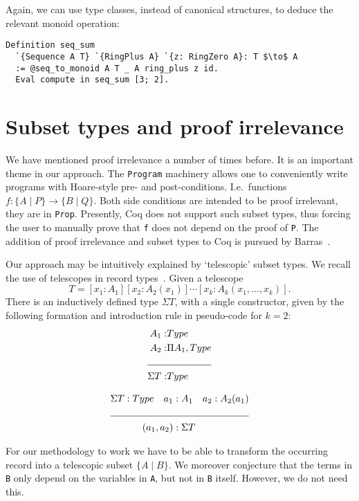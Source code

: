 \documentclass[a4paper,10pt,runningheads]{llncs}
\begin{document}
Again, we can use type classes, instead of canonical structures, to deduce the relevant monoid operation:
\begin{lstlisting}
Definition seq_sum
  `{Sequence A T} `{RingPlus A} `{z: RingZero A}: T $\to$ A
  := @seq_to_monoid A T _ A ring_plus z id.
  Eval compute in seq_sum [3; 2].
\end{lstlisting}

\section{Subset types and proof irrelevance}\label{PI}
We have mentioned proof irrelevance a number of times before. It is an important theme in our
approach. The \lstinline|Program| machinery allows one to conveniently write programs with Hoare-style
pre- and post-conditions. I.e.\ functions $f: \{ A \mid P \} \to \{ B \mid Q \}$. Both side
conditions
are intended to be proof irrelevant, they are in \lstinline|Prop|. Presently, Coq does not support such subset
types, thus forcing the user to manually prove that \lstinline|f| does not depend on the proof of \lstinline|P|.
The addition of proof irrelevance and subset types to Coq is pursued by
Barras~\cite{Barras:subset,Werner08}. 

Our approach may be intuitively explained by `telescopic' subset types. We recall the use of telescopes in record types~\cite{pollack2000dependently}. Given a telescope\[
T=[x_1:A_1][x_2:A_2(x_1)]\cdots[x_k:A_k(x_1,\ldots,x_k)].
\]
There is an inductively defined type $\Sigma T$, with a single constructor, given by the following 
formation and introduction rule in pseudo-code for $k=2$:
\begin{align*}
 A_1 :& Type\\
 A_2 :& \Pi A_1,Type\\
\cline{1-2}
\Sigma T :& Type
\end{align*}

\begin{align*}
 \Sigma T:Type\quad a_1 &:A_1 \quad a_2 : A_2(a_1)\\
\cline{1-3}
(a_1,a_2) &: \Sigma T
\end{align*}

For our methodology to work we have to be able to transform the occurring record into a telescopic
subset $\{ A \mid  B\}$. We moreover conjecture that the terms in \lstinline|B| only depend on the
variables in \lstinline|A|, but not in \lstinline|B| itself. However, we do not need this.
\end{document}
